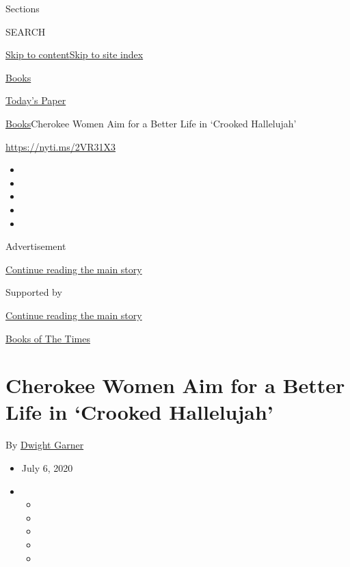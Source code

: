 Sections

SEARCH

\protect\hyperlink{site-content}{Skip to
content}\protect\hyperlink{site-index}{Skip to site index}

\href{https://www.nytimes3xbfgragh.onion/section/books}{Books}

\href{https://myaccount.nytimes3xbfgragh.onion/auth/login?response_type=cookie\&client_id=vi}{}

\href{https://www.nytimes3xbfgragh.onion/section/todayspaper}{Today's
Paper}

\href{/section/books}{Books}\textbar{}Cherokee Women Aim for a Better
Life in `Crooked Hallelujah'

\url{https://nyti.ms/2VR31X3}

\begin{itemize}
\item
\item
\item
\item
\item
\end{itemize}

Advertisement

\protect\hyperlink{after-top}{Continue reading the main story}

Supported by

\protect\hyperlink{after-sponsor}{Continue reading the main story}

\href{/column/books-of-the-times}{Books of The Times}

\hypertarget{cherokee-women-aim-for-a-better-life-in-crooked-hallelujah}{%
\section{Cherokee Women Aim for a Better Life in `Crooked
Hallelujah'}\label{cherokee-women-aim-for-a-better-life-in-crooked-hallelujah}}

By \href{https://www.nytimes3xbfgragh.onion/by/dwight-garner}{Dwight
Garner}

\begin{itemize}
\item
  July 6, 2020
\item
  \begin{itemize}
  \item
  \item
  \item
  \item
  \item
  \end{itemize}
\end{itemize}

